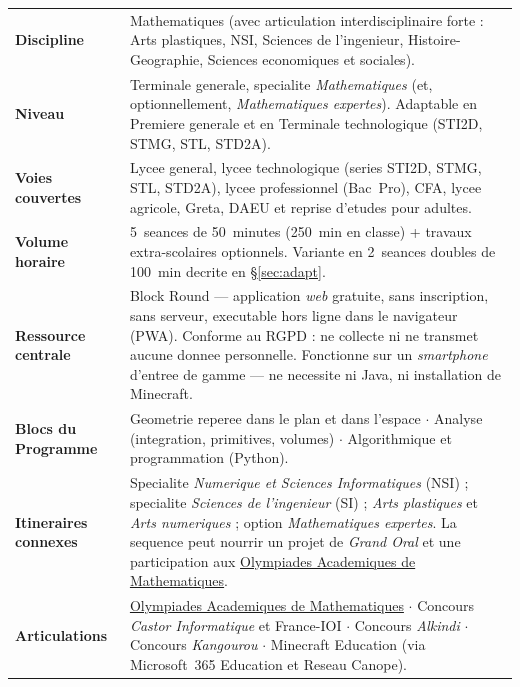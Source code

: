 \documentclass[12pt,a4paper]{scrartcl}
\begin{document}
\begin{center}
\begin{tabular}{@{}p{}p{}@{}}
\toprule
\textbf{Discipline} & Mathematiques (avec articulation interdisciplinaire forte : Arts plastiques, NSI, Sciences de l'ingenieur, Histoire-Geographie, Sciences economiques et sociales). \\
\addlinespace[2pt]
\textbf{Niveau} & Terminale generale, specialite \emph{Mathematiques} (et, optionnellement, \emph{Mathematiques expertes}). Adaptable en Premiere generale et en Terminale technologique (STI2D, STMG, STL, STD2A). \\
\addlinespace[2pt]
\textbf{Voies couvertes} & Lycee general, lycee technologique (series STI2D, STMG, STL, STD2A), lycee professionnel (Bac~Pro), CFA, lycee agricole, Greta, DAEU et reprise d'etudes pour adultes. \\
\addlinespace[2pt]
\textbf{Volume horaire} & 5~seances de 50~minutes (250~min en classe) + travaux extra-scolaires optionnels. Variante en 2~seances doubles de 100~min decrite en §\ref{sec:adapt}. \\
\addlinespace[2pt]
\textbf{Ressource centrale} & Block Round --- application \emph{web} gratuite, sans inscription, sans serveur, executable hors ligne dans le navigateur (PWA). Conforme au RGPD : ne collecte ni ne transmet aucune donnee personnelle. Fonctionne sur un \emph{smartphone} d'entree de gamme --- ne necessite ni Java, ni installation de Minecraft. \\
\addlinespace[2pt]
\textbf{Blocs du Programme} & Geometrie reperee dans le plan et dans l'espace $\cdot$ Analyse (integration, primitives, volumes) $\cdot$ Algorithmique et programmation (Python). \\
\addlinespace[2pt]
\textbf{Itineraires connexes} & Specialite \emph{Numerique et Sciences Informatiques} (NSI) ; specialite \emph{Sciences de l'ingenieur} (SI) ; \emph{Arts plastiques} et \emph{Arts numeriques} ; option \emph{Mathematiques expertes}. La sequence peut nourrir un projet de \emph{Grand Oral} et une participation aux \hyperref[sec:olympiades]{Olympiades Academiques de Mathematiques}. \\
\addlinespace[2pt]
\textbf{Articulations} & \hyperref[sec:olympiades]{Olympiades Academiques de Mathematiques} $\cdot$ Concours \emph{Castor Informatique} et France-IOI $\cdot$ Concours \emph{Alkindi} $\cdot$ Concours \emph{Kangourou} $\cdot$ Minecraft Education (via Microsoft~365 Education et Reseau Canope). \\

\end{tabular}
\end{center}
\end{document}
